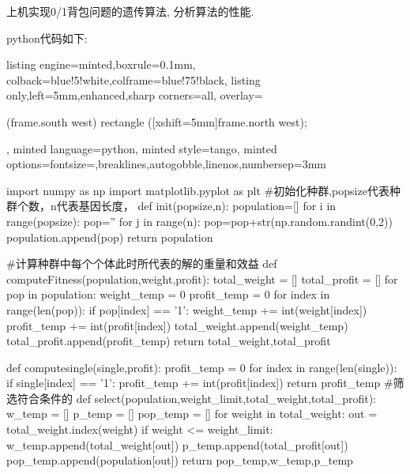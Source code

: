 \documentclass{article}
\begin{document}
\begin{homeworkProblem}
    上机实现0/1背包问题的遗传算法, 分析算法的性能.

    \solution python代码如下:
\begin{tcblisting}{listing engine=minted,boxrule=0.1mm,
colback=blue!5!white,colframe=blue!75!black,
listing only,left=5mm,enhanced,sharp corners=all,
overlay={\begin{tcbclipinterior} (frame.south west)
rectangle ([xshift=5mm]frame.north west);\end{tcbclipinterior}},
minted language=python,
minted style=tango,
minted options={fontsize=\small,breaklines,autogobble,linenos,numbersep=3mm}}
import numpy as np
import matplotlib.pyplot as plt
#初始化种群,popsize代表种群个数，n代表基因长度，
def init(popsize,n):
    population=[]
    for i in range(popsize):
        pop=''
        for j in range(n):
            pop=pop+str(np.random.randint(0,2))
        population.append(pop)
    return population

#计算种群中每个个体此时所代表的解的重量和效益
def computeFitness(population,weight,profit):
    total_weight = []
    total_profit = []
    for pop in population:
        weight_temp = 0
        profit_temp = 0
        for index in range(len(pop)):
            if pop[index] == '1':
                weight_temp += int(weight[index])
                profit_temp += int(profit[index])
        total_weight.append(weight_temp)
        total_profit.append(profit_temp)
    return  total_weight,total_profit
 
def computesingle(single,profit):
    profit_temp = 0
    for index in range(len(single)):
        if single[index] == '1':
            profit_temp += int(profit[index])
    return profit_temp
#筛选符合条件的
def select(population,weight_limit,total_weight,total_profit):
    w_temp = []
    p_temp = []
    pop_temp = []
    for weight in total_weight:
        out = total_weight.index(weight)
        if weight <= weight_limit:
            w_temp.append(total_weight[out])
            p_temp.append(total_profit[out])
            pop_temp.append(population[out])
    return pop_temp,w_temp,p_temp
\end{tcblisting}


\end{homeworkProblem}
\end{document}

